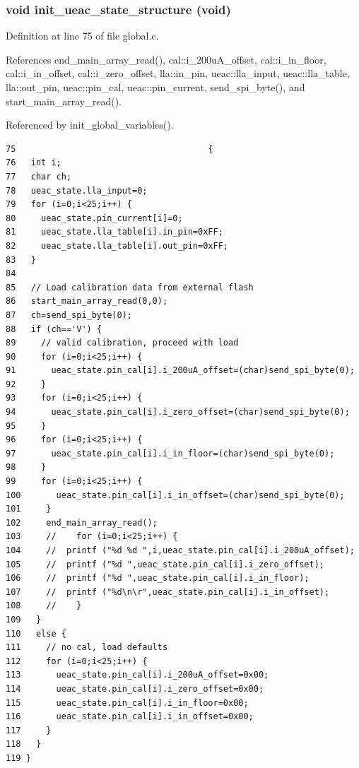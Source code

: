 \subsubsection{\setlength{\rightskip}{0pt plus 5cm}void init\_\-ueac\_\-state\_\-structure (void)}\label{global_8c_a9}




Definition at line 75 of file global.c.

References end\_\-main\_\-array\_\-read(), cal::i\_\-200u\-A\_\-offset, cal::i\_\-in\_\-floor, cal::i\_\-in\_\-offset, cal::i\_\-zero\_\-offset, lla::in\_\-pin, ueac::lla\_\-input, ueac::lla\_\-table, lla::out\_\-pin, ueac::pin\_\-cal, ueac::pin\_\-current, send\_\-spi\_\-byte(), and start\_\-main\_\-array\_\-read().

Referenced by init\_\-global\_\-variables().

\footnotesize\begin{verbatim}75                                      {
76   int i;
77   char ch; 
78   ueac_state.lla_input=0;
79   for (i=0;i<25;i++) {
80     ueac_state.pin_current[i]=0;
81     ueac_state.lla_table[i].in_pin=0xFF;
82     ueac_state.lla_table[i].out_pin=0xFF;
83   }
84 
85   // Load calibration data from external flash
86   start_main_array_read(0,0); 
87   ch=send_spi_byte(0);
88   if (ch=='V') {
89     // valid calibration, proceed with load
90     for (i=0;i<25;i++) {
91       ueac_state.pin_cal[i].i_200uA_offset=(char)send_spi_byte(0);
92     }
93     for (i=0;i<25;i++) {
94       ueac_state.pin_cal[i].i_zero_offset=(char)send_spi_byte(0);
95     }
96     for (i=0;i<25;i++) {
97       ueac_state.pin_cal[i].i_in_floor=(char)send_spi_byte(0);
98     }
99     for (i=0;i<25;i++) {
100       ueac_state.pin_cal[i].i_in_offset=(char)send_spi_byte(0);
101     }
102     end_main_array_read();
103     //    for (i=0;i<25;i++) {
104     //  printf ("%d %d ",i,ueac_state.pin_cal[i].i_200uA_offset);
105     //  printf ("%d ",ueac_state.pin_cal[i].i_zero_offset);
106     //  printf ("%d ",ueac_state.pin_cal[i].i_in_floor);
107     //  printf ("%d\n\r",ueac_state.pin_cal[i].i_in_offset);
108     //    }     
109   }
110   else {
111     // no cal, load defaults 
112     for (i=0;i<25;i++) {
113       ueac_state.pin_cal[i].i_200uA_offset=0x00;
114       ueac_state.pin_cal[i].i_zero_offset=0x00;
115       ueac_state.pin_cal[i].i_in_floor=0x00;
116       ueac_state.pin_cal[i].i_in_offset=0x00;
117     }
118   }
119 }
\end{verbatim}\normalsize 




